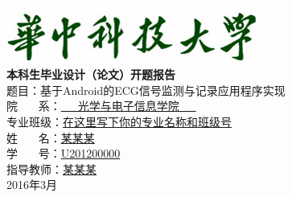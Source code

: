 \begin{titlepage}
\begin{center}
~~\\ 
\vspace{2.6cm}
\includegraphics[scale=1.3]{univ-title.png}
\\
\erhao
\vspace{1.3cm}
\zhongsong \textbf{本科生毕业设计（论文）开题报告\\}
\vspace{2cm}
\fontsize{15.75pt}{20pt}\selectfont
{题目：基于Android的ECG信号监测与记录应用程序实现\\}
\vspace{2cm}
\fontsize{15.75pt}{48pt}\selectfont 
\zhongsong
院 \quad ~~~系：\underline{\quad \quad ~~~光学与电子信息学院~~~ \quad \quad}\\
专业班级：\underline{在这里写下你的专业名称和班级号} \\ 
姓 \quad ~~~名：\underline{\phantom{aaaaaaaaaaaaaa}某某某\phantom{aaaaaaaaaaaaa}} \\ 
学 \quad ~~~号：\underline{\phantom{aaaaaaaaaaa}U201200000\phantom{aaaaaaaaaaa}} \\ 
指导教师：\underline{\phantom{aaaaaaaaaaaaaa}某某某\phantom{aaaaaaaaaaaaa}} \\  
\vspace{1cm}
2016年3月\\
\end{center}
\end{titlepage}
